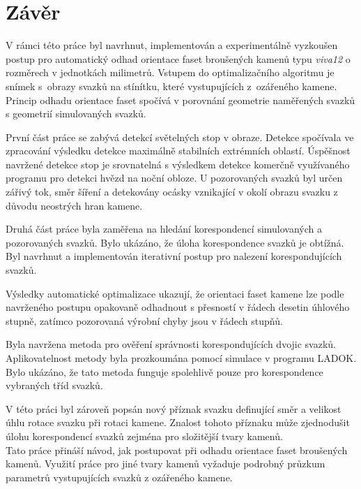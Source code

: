 \part{Závěr}
	V rámci této práce byl navrhnut, implementován a experimentálně vyzkoušen postup pro automatický odhad orientace faset broušených kamenů typu \textit{viva12} o rozměrech v jednotkách milimetrů. Vstupem do optimalizačního algoritmu je snímek s~obrazy svazků na stínítku, které vystupujících z~ozářeného kamene. Princip odhadu orientace faset spočívá v porovnání geometrie naměřených svazků s geometrií simulovaných svazků.
	
První část práce se zabývá detekcí světelných stop v obraze. Detekce spočívala ve zpracování výsledku detekce maximálně stabilních extrémních oblastí. Úspěšnost navržené detekce stop je srovnatelná s výsledkem detekce komerčně využívaného programu pro detekci hvězd na noční obloze. U pozorovaných svazků byl určen zářivý tok, směr šíření a detekovány ocásky vznikající v okolí obrazu svazku z důvodu neostrých hran kamene.

Druhá část práce byla zaměřena na hledání korespondencí simulovaných a pozorovaných svazků. Bylo ukázáno, že úloha korespondence svazků je obtížná. Byl navrhnut a implementován iterativní postup pro nalezení korespondujících svazků. 

Výsledky automatické optimalizace ukazují, že orientaci faset kamene lze podle navrženého postupu opakovaně odhadnout s přesností v řádech desetin úhlového stupně, zatímco pozorovaná výrobní chyby jsou v řádech stupňů.

Byla navržena metoda pro ověření správnosti korespondujících dvojic svazků.  Aplikovatelnost metody byla prozkoumána pomocí simulace v programu LADOK. Bylo ukázáno, že tato metoda funguje spolehlivě pouze pro korespondence vybraných tříd svazků. %

V této práci byl zároveň popsán nový příznak svazku definující směr a velikost úhlu rotace svazku při rotaci kamene. Znalost tohoto příznaku může zjednodušit úlohu korespondencí svazků zejména pro složitější tvary kamenů.\\

Tato práce přináší návod, jak postupovat při odhadu orientace faset broušených kamenů. Využití práce pro jiné tvary kamenů vyžaduje podrobný průzkum parametrů vystupujících svazků z ozářeného kamene.
	
	 
	  
	 
	   
	
	